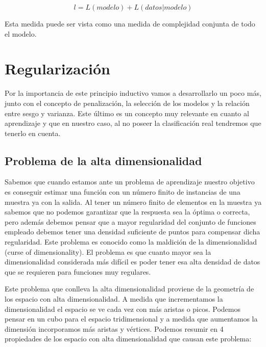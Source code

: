 $$l = L(modelo) + L(datos | modelo)$$

Esta medida puede ser vista como una medida de complejidad conjunta de todo el modelo.

\section{Regularización}

Por la importancia de este principio inductivo vamos a desarrollarlo un poco más, junto con el concepto de penalización, la selección de los modelos y la relación entre sesgo y varianza. Este último es un concepto muy relevante en cuanto al aprendizaje y que en nuestro caso, al no poseer la clasificación real tendremos que tenerlo en cuenta.

\subsection{Problema de la alta dimensionalidad}

Sabemos que cuando estamos ante un problema de aprendizaje nuestro objetivo es conseguir estimar una función con un número finito de instancias de una muestra ya con la salida. Al tener un número finito de elementos en la muestra ya sabemos que no podemos garantizar que la respuesta sea la óptima o correcta, pero además debemos pensar que a mayor regularidad del conjunto de funciones empleado debemos tener una densidad suficiente de puntos para compensar dicha regularidad. Este problema es conocido como la maldición de la dimensionalidad (curse of dimensionality). El problema es que cuanto mayor sea la dimensionalidad considerada más difícil es poder tener esa alta densidad de datos que se requieren para funciones muy regulares.

Este problema que conlleva la alta dimensionalidad proviene de la geometría de los espacio con alta dimensionalidad. A medida que incrementamos la dimensionalidad el espacio se ve cada vez con más aristas o picos. Podemos pensar en un cubo para el espacio tridimensional y a medida que aumentamos la dimensión incorporamos más aristas y vértices. Podemos resumir en 4 propiedades de los espacio con alta dimensionalidad que causan este problema:

